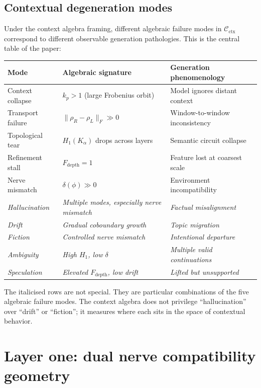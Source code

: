 \documentclass[11pt]{amsart}
\theoremstyle{definition}
\newcommand{\Cctx}{\mathcal{C}_{\!\mathrm{ctx}}}
\newcommand{\Ka}{K_\alpha}
\newcommand{\rhoR}{\rho_R}
\newcommand{\rhoL}{\rho_L}
\begin{document}
\subsection{Contextual degeneration modes}

Under the context algebra framing, different algebraic failure modes
in $\Cctx$ correspond to different observable generation pathologies.
This is the central table of the paper:

\begin{center}
\renewcommand{\arraystretch}{1.3}
\begin{tabular}{@{}p{2.8cm}p{3.5cm}p{4.5cm}@{}}
\toprule
Mode & Algebraic signature & Generation phenomenology \\
\midrule
Context collapse & $k_p > 1$ (large Frobenius orbit) & Model ignores distant context \\
Transport failure & $\|\rhoR - \rhoL\|_F \gg 0$ & Window-to-window inconsistency \\
Topological tear & $H_1(\Ka)$ drops across layers & Semantic circuit collapse \\
Refinement stall & $F_{\mathrm{depth}} = 1$ & Feature lost at coarsest scale \\
Nerve mismatch & $\delta(\phi) \gg 0$ & Environment incompatibility \\
\midrule
\textit{Hallucination} & \textit{Multiple modes, especially nerve mismatch} & \textit{Factual misalignment} \\
\textit{Drift} & \textit{Gradual coboundary growth} & \textit{Topic migration} \\
\textit{Fiction} & \textit{Controlled nerve mismatch} & \textit{Intentional departure} \\
\textit{Ambiguity} & \textit{High $H_1$, low $\delta$} & \textit{Multiple valid continuations} \\
\textit{Speculation} & \textit{Elevated $F_\mathrm{depth}$, low drift} & \textit{Lifted but unsupported} \\
\bottomrule
\end{tabular}
\end{center}

The italicised rows are not special.
They are particular combinations of the five algebraic failure modes.
The context algebra does not privilege ``hallucination'' over ``drift'' or
``fiction''; it measures where each sits in the space of contextual behavior.

\section{Layer one: dual nerve compatibility geometry}
\label{sec:dual-nerve}
\end{document}
